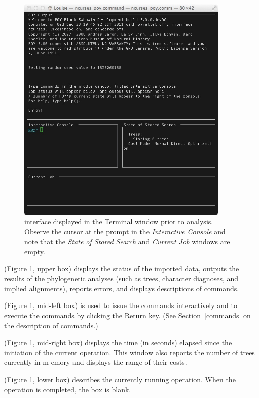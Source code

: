 {\begin{figure}[htbp]
\centering
\includegraphics[width=0.9\textwidth]{doc/figures/figinterface.jpg}
\caption{\poy interface displayed in the Terminal window prior to analysis. 
Observe the cursor at the \poy prompt in the \emph{Interactive Console} 
and note that the \emph{State of Stored Search} and \emph{Current Job} 
windows are empty.}
\label{fig:figinterface}
\end{figure}

\begin{description}
\setlength{\labelsep}{5pt}
\setlength{\itemindent}{0pt}%
\item[POY Output] (Figure \ref{fig:figinterface}, upper box) displays the 
status of the imported data, outputs the results of the phylogenetic analyses 
(such as trees, character diagnoses, and implied alignments), reports errors, 
and displays descriptions of \poy commands.
\item[Interactive Console] (Figure \ref{fig:figinterface}, mid-left box) 
is used to issue the commands interactively and to execute the commands 
by clicking the Return key. (See Section~\ref{commands} on the description 
of \poy commands.)
\item[State of Stored Search] (Figure \ref{fig:figinterface}, mid-right box) 
displays the time (in seconds) elapsed since the initiation of the current 
operation. This window also reports the number of trees currently in m
emory and displays the range of their costs.
\item[Current Job] (Figure \ref{fig:figinterface}, lower box) describes the 
currently running operation. When the operation is completed, the box is blank.
\end{description} 

}

